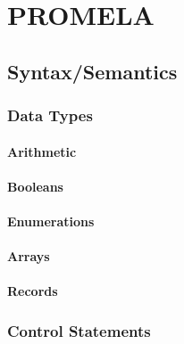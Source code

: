 \documentclass[a4paper, 11pt, accentcolor = tud3b]{tudreport}
\begin{document}
    \chapter{PROMELA} %

        \section{Syntax/Semantics} %

            \subsection{Data Types} %

                \subsubsection{Arithmetic} %

                \subsubsection{Booleans} %

                \subsubsection{Enumerations} %

                \subsubsection{Arrays} %

                \subsubsection{Records} %

            \subsection{Control Statements} %
\end{document}
